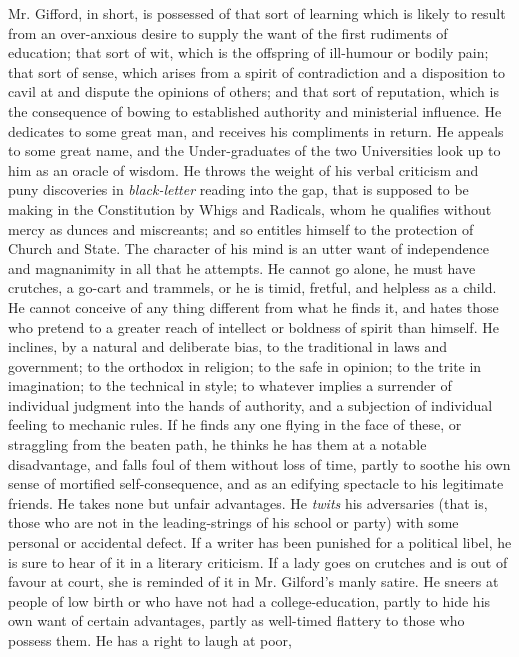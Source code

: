 Mr. Gifford, in short, is possessed of that sort of learning which
is likely to result from an over-anxious desire to supply the want
of the first rudiments of education; that sort of wit, which is
the offspring of ill-humour or bodily pain; that sort of sense,
which arises from a spirit of contradiction and a disposition to
cavil at and dispute the opinions of others; and that sort of
reputation, which is the consequence of bowing to established
authority and ministerial influence. He dedicates to some great
man, and receives his compliments in return. He appeals to some
great name, and the Under-graduates of the two Universities look
up to him as an oracle of wisdom. He throws the weight of his
verbal criticism and puny discoveries in \emph{black-letter}
reading into the gap, that is supposed to be making in the
Constitution by Whigs and Radicals, whom he qualifies without
mercy as dunces and miscreants; and so entitles himself to the
protection of Church and State. The character of his mind is an
utter want of independence and magnanimity in all that he
attempts. He cannot go alone, he must have crutches, a go-cart and
trammels, or he is timid, fretful, and helpless as a child. He
cannot conceive of any thing different from what he finds it, and
hates those who pretend to a greater reach of intellect or
boldness of spirit than himself. He inclines, by a natural and
deliberate bias, to the traditional in laws and government; to the
orthodox in religion; to the safe in opinion; to the trite in
imagination; to the technical in style; to whatever implies a
surrender of individual judgment into the hands of authority, and
a subjection of individual feeling to mechanic rules. If he finds
any one flying in the face of these, or straggling from the beaten
path, he thinks he has them at a notable disadvantage, and falls
foul of them without loss of time, partly to soothe his own sense
of mortified self-consequence, and as an edifying spectacle to his
legitimate friends. He takes none but unfair advantages. He
\emph{twits} his adversaries (that is, those who are not in the
leading-strings of his school or party) with some personal or
accidental defect. If a writer has been punished for a political
libel, he is sure to hear of it in a literary criticism. If a lady
goes on crutches and is out of favour at court, she is reminded of
it in Mr.  Gilford's manly satire. He sneers at people of low
birth or who have not had a college-education, partly to hide his
own want of certain advantages, partly as well-timed flattery to
those who possess them. He has a right to laugh at poor,
